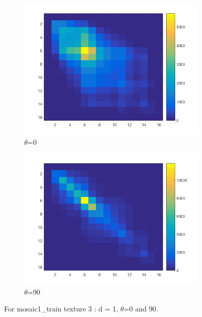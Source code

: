\documentclass[a4paper, article, oneside, UKenglish]{memoir}
\newcommand{\0}{\mathbf{0}}
\newcommand{\1}{\mathbf{1}}
\begin{document}
\begin{figure}
  \centering
  \begin{subfigure}[b]{0.45\linewidth}
    \includegraphics[width=\linewidth]{./images/tx3-0.png}
    \caption{$\theta$=0}
  \end{subfigure}
  \begin{subfigure}[b]{0.45\linewidth}
    \includegraphics[width=\linewidth]{./images/tx3-90.png}
    \caption{$\theta$=90}
  \end{subfigure}
  \caption{For mosaic1\_train texture 3 : d = 1, $\theta$=0 and 90.}
  \label{fig:t3glcm}
\end{figure}
\end{document}
